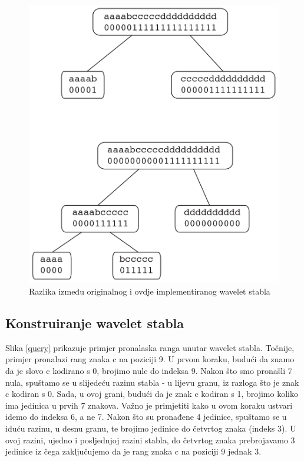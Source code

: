 \begin{figure}[H]
\centering
\includegraphics[scale=0.2]{./pictures/Waveletusporedba.jpg}
\caption{Razlika između originalnog i ovdje implementiranog wavelet stabla}\label{usporedba}
\end{figure}



\subsection{Konstruiranje wavelet stabla}
Slika \ref{query} prikazuje primjer pronalaska ranga unutar wavelet stabla. Točnije, primjer pronalazi rang znaka c na poziciji 9. U prvom koraku, budući da znamo da je slovo c kodirano s 0, brojimo nule do indeksa 9. Nakon što smo pronašli 7 nula, spuštamo se u slijedeću razinu stabla - u lijevu granu, iz razloga što je znak c kodiran s 0. Sada, u ovoj grani, budući da je znak c kodiran s 1, brojimo koliko ima jedinica u prvih 7 znakova. Važno je primjetiti kako u ovom koraku ustvari idemo do indeksa 6, a ne 7. Nakon što su pronađene 4 jedinice, spuštamo se u iduću razinu, u desnu granu, te brojimo jedinice do četvrtog znaka (indeks 3). U ovoj razini, ujedno i posljednjoj razini stabla, do četvrtog znaka prebrojavamo 3 jedinice iz čega zaključujemo da je rang znaka c na poziciji 9 jednak 3.

